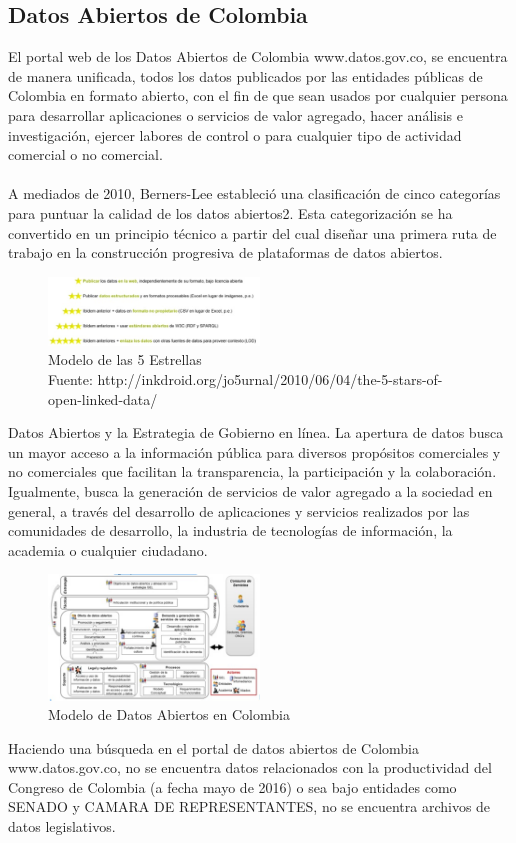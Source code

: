 \documentclass[conference]{IEEEtran}
\begin{document}
  \subsection{Datos Abiertos de Colombia} 
    El portal web de los Datos Abiertos de Colombia www.datos.gov.co, se encuentra de manera unificada, todos los datos publicados por las entidades públicas de Colombia en formato abierto, con el fin de que sean usados por cualquier persona para desarrollar aplicaciones o servicios de valor agregado, hacer análisis e investigación, ejercer labores de control o para cualquier tipo de actividad comercial o no comercial.      \\ \\  
    A mediados de 2010, Berners-Lee estableció una clasificación de cinco categorías para puntuar la calidad de los datos abiertos2. Esta categorización se ha convertido en un principio técnico a partir del cual diseñar una primera ruta de trabajo en la construcción progresiva de plataformas de datos abiertos.
    \begin{figure}[h]
    	\centering
    	\includegraphics[width=0.5\textwidth]{datos-abiertos-col}
    	\caption{Modelo de las 5 Estrellas \\ \small Fuente: http://inkdroid.org/jo5urnal/2010/06/04/the-5-stars-of-open-linked-data/}
    \end{figure}
    Datos Abiertos y la Estrategia de Gobierno en línea. La apertura de datos busca un mayor acceso a la información pública para diversos propósitos comerciales y no comerciales que facilitan la transparencia, la participación y la colaboración. Igualmente, busca la generación de servicios de valor agregado a la sociedad en general, a través del desarrollo de aplicaciones y servicios realizados por las  comunidades de desarrollo, la industria de tecnologías de información, la academia o cualquier ciudadano.
    \begin{figure}[h]
    	\centering
    	\includegraphics[width=0.5\textwidth]{modelo-datos-col}
    	\caption{Modelo de Datos Abiertos en Colombia}
    \end{figure}
    Haciendo una búsqueda en el portal de datos abiertos de Colombia www.datos.gov.co, no se encuentra datos relacionados con la productividad del Congreso de Colombia (a fecha mayo de 2016) o sea bajo entidades como SENADO y CAMARA DE REPRESENTANTES, no se encuentra archivos de datos legislativos.  
\end{document}
